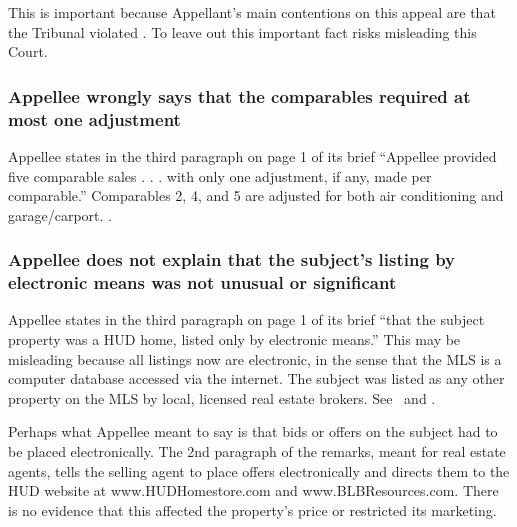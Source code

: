 \documentclass[12pt,\documentclassflag]{michiganCourtOfAppealsBrief}
\begin{document}
This is important because Appellant's main contentions on this appeal are that the Tribunal violated \mathieuGast. To leave out this important fact risks misleading this Court.

\subsubsection{Appellee wrongly says that the comparables required at most one adjustment}

Appellee states in the third paragraph on page 1 of its brief ``Appellee provided five comparable sales . . . with only one adjustment, if any, made per comparable.'' Comparables 2, 4, and 5 are adjusted for both air conditioning and garage/carport. \cityEvidence[2].

\subsubsection{Appellee does not explain that the subject's listing by electronic means was not unusual or significant}


Appellee states in the third paragraph on page 1 of its brief ``that the subject property was a HUD home, listed only by electronic means.'' This may be misleading because all listings now are electronic, in the sense that the MLS is a computer database accessed via the internet. The subject was listed as any other property on the MLS by local, licensed real estate brokers. See \mlsListing\ and \mlsHistory.

Perhaps what Appellee meant to say is that bids or offers on the subject had to be placed electronically. The 2nd paragraph of the remarks, meant for real estate agents, tells the selling agent to place offers electronically and directs them to the HUD website at www.HUDHomestore.com and www.BLBResources.com. There is no evidence that this affected the property's price or restricted its marketing.

\end{document}
